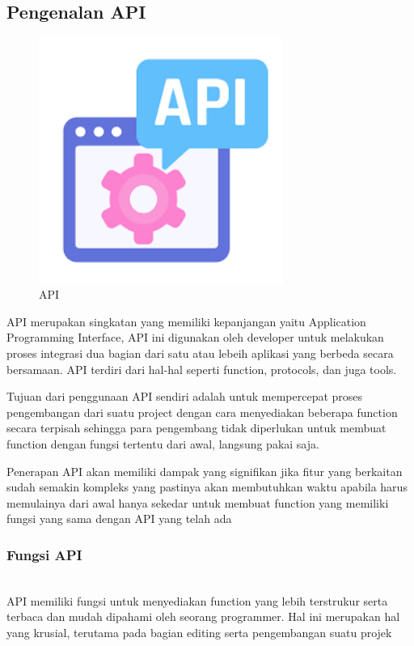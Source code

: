 		
\subsection{Pengenalan API}
	\begin{figure}[H]
		\includegraphics[width=8cm]{figures/GambarAPI.png}
		\centering
		\caption{API}
	\end{figure}
API merupakan singkatan yang memiliki kepanjangan yaitu Application Programming Interface, API ini digunakan oleh developer untuk melakukan proses integrasi dua bagian dari satu atau lebeih aplikasi yang berbeda secara bersamaan. API terdiri dari hal-hal seperti function, protocols, dan juga tools. 

Tujuan dari penggunaan API sendiri adalah untuk mempercepat proses pengembangan dari suatu project dengan cara menyediakan beberapa function secara terpisah sehingga para pengembang tidak diperlukan untuk membuat function dengan fungsi tertentu dari awal, langsung pakai saja.

Penerapan API akan memiliki dampak yang signifikan jika fitur yang berkaitan sudah semakin kompleks yang pastinya akan membutuhkan waktu apabila harus memulainya dari awal hanya sekedar untuk membuat function yang memiliki fungsi yang sama dengan API yang telah ada

\subsubsection{Fungsi API}
\hfill\\
API memiliki fungsi untuk menyediakan function yang lebih terstrukur serta terbaca dan mudah dipahami oleh seorang programmer. Hal ini merupakan hal yang krusial, terutama pada bagian editing serta pengembangan suatu projek


